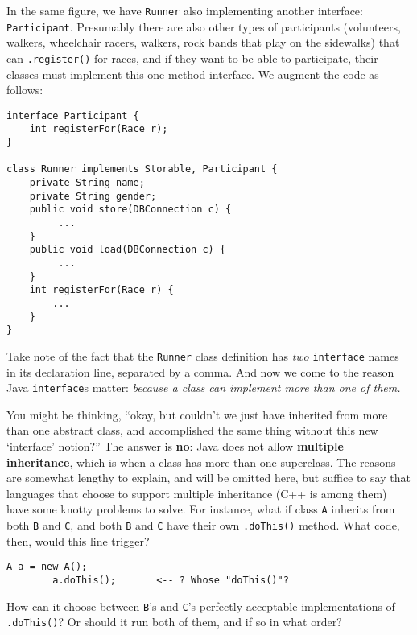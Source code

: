 In the same figure, we have \texttt{Runner} also implementing another
interface: \texttt{Participant}. Presumably there are also other types of
participants (volunteers, walkers, wheelchair racers, walkers, rock bands that
play on the sidewalks) that can \texttt{.register()} for races, and if they
want to be able to participate, their classes must implement this one-method
interface. We augment the code as follows:

\begin{Verbatim}[fontsize=\scriptsize,samepage=true,frame=single]
interface Participant {
    int registerFor(Race r);
}

class Runner implements Storable, Participant {                        
    private String name;
    private String gender;
    public void store(DBConnection c) {
         ...
    }
    public void load(DBConnection c) {
         ...
    }
    int registerFor(Race r) {
        ...
    }
}                                            
\end{Verbatim}

Take note of the fact that the \texttt{Runner} class definition has
\textit{two} \texttt{interface} names in its declaration line, separated by a
comma. And now we come to the reason Java \texttt{interface}s matter:
\textit{because a class can implement more than one of them.}

You might be thinking, ``okay, but couldn't we just have inherited from more
than one abstract class, and accomplished the same thing without this new
`interface' notion?'' The answer is \textbf{no}: Java does not allow
\textbf{multiple inheritance}, which is when a class has more than one
superclass. The reasons are somewhat lengthy to explain, and will be omitted
here, but suffice to say that languages that choose to support multiple
inheritance (C++ is among them) have some knotty problems to solve. For
instance, what if class \texttt{A} inherits from both \texttt{B} and
\texttt{C}, and both \texttt{B} and \texttt{C} have their own
\texttt{.doThis()} method. What code, then, would this line trigger?

\begin{Verbatim}[fontsize=\small,samepage=true]
        A a = new A();
        a.doThis();       <-- ? Whose "doThis()"?
\end{Verbatim}

How can it choose between \texttt{B}'s and \texttt{C}'s perfectly acceptable
implementations of \texttt{.doThis()}? Or should it run both of them, and if
so in what order?

